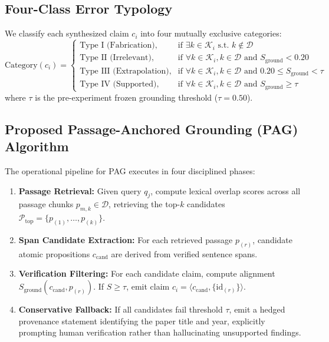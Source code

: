 \documentclass[acmsmall,screen]{acmart}
\begin{document}
\subsection{Four-Class Error Typology}
We classify each synthesized claim $c_i$ into four mutually exclusive categories:
\begin{equation}
\text{Category}(c_i) = 
\begin{cases}
\text{Type I (Fabrication)}, & \text{if } \exists k \in \mathcal{K}_i \text{ s.t. } k \notin \mathcal{D} \\
\text{Type II (Irrelevant)}, & \text{if } \forall k \in \mathcal{K}_i, k \in \mathcal{D} \text{ and } S_{\text{ground}} < 0.20 \\
\text{Type III (Extrapolation)}, & \text{if } \forall k \in \mathcal{K}_i, k \in \mathcal{D} \text{ and } 0.20 \le S_{\text{ground}} < \tau \\
\text{Type IV (Supported)}, & \text{if } \forall k \in \mathcal{K}_i, k \in \mathcal{D} \text{ and } S_{\text{ground}} \ge \tau
\end{cases}
\end{equation}
where $\tau$ is the pre-experiment frozen grounding threshold ($\tau = 0.50$).

\subsection{Proposed Passage-Anchored Grounding (PAG) Algorithm}
The operational pipeline for PAG executes in four disciplined phases:
\begin{enumerate}
    \item \textbf{Passage Retrieval:} Given query $q_j$, compute lexical overlap scores across all passage chunks $p_{m,k} \in \mathcal{D}$, retrieving the top-$k$ candidates $\mathcal{P}_{\text{top}} = \{p_{(1)}, \dots, p_{(k)}\}$.
    \item \textbf{Span Candidate Extraction:} For each retrieved passage $p_{(r)}$, candidate atomic propositions $c_{\text{cand}}$ are derived from verified sentence spans.
    \item \textbf{Verification Filtering:} For each candidate claim, compute alignment $S_{\text{ground}}(c_{\text{cand}}, p_{(r)})$. If $S \ge \tau$, emit claim $c_i = \langle c_{\text{cand}}, \{\text{id}_{(r)}\} \rangle$.
    \item \textbf{Conservative Fallback:} If all candidates fail threshold $\tau$, emit a hedged provenance statement identifying the paper title and year, explicitly prompting human verification rather than hallucinating unsupported findings.
\end{enumerate}
\end{document}
